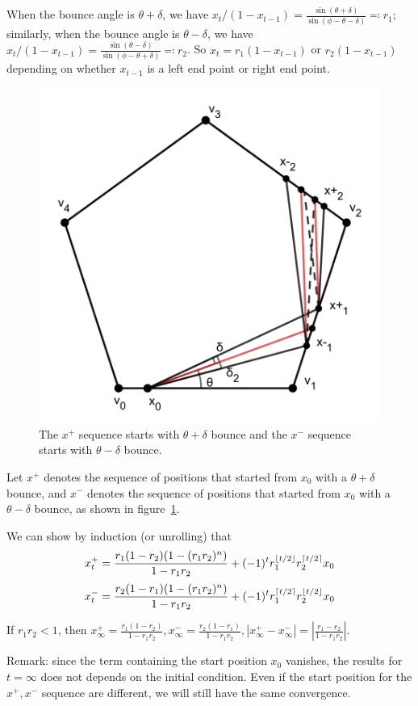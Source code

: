 \documentclass[11pt]{article}%
\begin{document}
When the bounce angle is $\theta + \delta$, we have $x_{t} / (1-x_{t-1}) = \frac{\sin(\theta + \delta)}{\sin(\phi - \theta - \delta)} \eqqcolon r_{1}$; similarly, when the bounce angle is $\theta - \delta$, we have $x_{t} / (1-x_{t-1}) = \frac{\sin(\theta - \delta)}{\sin(\phi - \theta + \delta)} \eqqcolon r_{2}$. So $x_{t} = r_{1}(1-x_{t-1})$ or $r_{2}(1-x_{t-1})$ depending on whether $x_{t-1}$ is a left end point or right end point. 
\begin{figure}[!h]
  \centering
  \includegraphics[width=0.5\linewidth]{plus_minus_bounce.png}
  \caption{The $x^{+}$ sequence starts with $\theta+\delta$ bounce and the $x^{-}$ sequence starts with $\theta-\delta$ bounce.}
  \label{fig:plus_minus_bounce}
\end{figure}
Let $x^{+}$ denotes the sequence of positions that started from $x_{0}$ with a $\theta+\delta$ bounce, and $x^{-}$ denotes the sequence of positions that started from $x_{0}$ with a $\theta-\delta$ bounce, as shown in figure~\ref{fig:plus_minus_bounce}. 

We can show by induction (or unrolling) that 
\[x^{+}_{t} = \frac{r_{1}(1-r_{2})(1-(r_{1}r_{2})^{n})}{1-r_{1}r_{2}} + (-1)^{t}r_{1}^{\lfloor t/2 \rfloor}r_{2}^{\lceil t/2 \rceil}x_0\]
\[x^{-}_{t} = \frac{r_{2}(1-r_{1})(1-(r_{1}r_{2})^{n})}{1-r_{1}r_{2}} + (-1)^{t}r_{1}^{\lceil t/2 \rceil}r_{2}^{\lfloor t/2 \rfloor}x_0\]


If $r_{1}r_{2}<1$, then $x^{+}_{\infty} = \frac{r_{1}(1-r_{2})}{1-r_{1}r_{2}}, x^{-}_{\infty} = \frac{r_{2}(1-r_{1})}{1-r_{1}r_{2}}, |x^{+}_{\infty} - x^{-}_{\infty}| = |\frac{r_{1}-r_{2}}{1-r_{1}r_{2}}|$. 

Remark: since the term containing the start position $x_{0}$ vanishes, the results for $t = \infty$ does not depends on the initial condition. Even if the start position for the $x^{+}, x^{-}$ sequence are different, we will still have the same convergence. 
\end{document}
